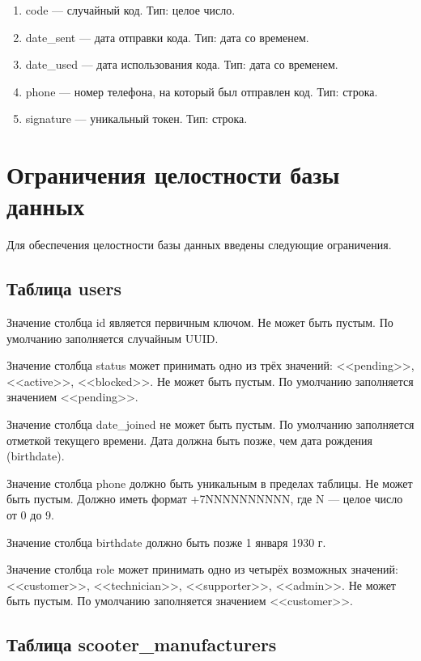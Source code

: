 \begin{enumerate}
    \item code --- случайный код. Тип: целое число. 
    \item date\_sent --- дата отправки кода. Тип: дата со временем. 
    \item date\_used --- дата использования кода. Тип: дата со временем.
    \item phone --- номер телефона, на который был отправлен код. Тип: строка. 
    \item signature --- уникальный токен. Тип: строка. 
\end{enumerate}

\section{Ограничения целостности базы данных}

Для обеспечения целостности базы данных введены следующие ограничения.

\subsection{Таблица users}

Значение столбца id является первичным ключом. Не может быть пустым. По умолчанию заполняется случайным UUID.

Значение столбца status может принимать одно из трёх значений: <<pending>>, <<active>>, <<blocked>>. Не может быть пустым. По умолчанию заполняется значением <<pending>>.

Значение столбца date\_joined не может быть пустым. По умолчанию заполняется отметкой текущего времени. Дата должна быть позже, чем дата рождения (birthdate).

Значение столбца phone должно быть уникальным в пределах таблицы. Не может быть пустым. Должно иметь формат +7NNNNNNNNNN, где N --- целое число от 0 до 9.

Значение столбца birthdate должно быть позже 1 января 1930 г.

Значение столбца role может принимать одно из четырёх возможных значений: <<customer>>, <<technician>>, <<supporter>>, <<admin>>. Не может быть пустым. По умолчанию заполняется значением <<customer>>.

\subsection{Таблица scooter\_manufacturers}

